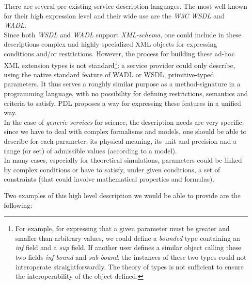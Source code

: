 \documentclass[a4paper,11pt] {ivoa}
\begin{document}
There are several pre-existing service description languages.
 The most well known for their high expression level and their
wide use are the \emph{W3C} \emph{WSDL} and
\textit{WADL}.\\
Since both {\it WSDL} and {\it WADL} support {\it XML-schema}, one could include in these descriptions complex and highly specialized 
XML objects for expressing conditions and/or restrictions. However, the process for building these ad-hoc XML extension types is not standard\footnote{For example, for expressing that a given parameter must be greater and smaller than arbitrary values, we could define a {\it bounded} type containing an {\it inf} field and a {\it sup} field. If another user defines a similar object calling these two fields {\it inf-bound} and {\it sub-bound}, the instances of these two types could not interoperate straightforwardly. The theory of types is not sufficient to ensure the interoperability of the object defined.}: 
a service provider could only describe, using the native standard feature of WADL or WSDL, primitive-typed parameters. It thus serves a roughly similar purpose as a method-signature in a programming language, with no possibility for defining 
restrictions, semantics and criteria to satisfy. PDL proposes a way for expressing these features in a unified way.\\

In the case of {\it generic services} for science, the description needs are very specific: since we
have to deal with complex formalisms and models, one should be able to describe for each parameter; its
physical meaning, its unit and precision and a range (or set) of admissible values (according to
a model).\\ 
In many cases, especially for theoretical simulations, parameters could be linked by
complex conditions or have to satisfy, under given conditions, a set of constraints (that could
involve mathematical properties and formulas).

Two examples of this high level description we would be able to provide are the following:
\end{document}
